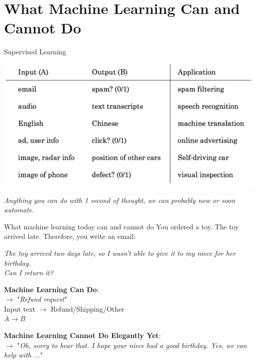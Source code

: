 \documentclass[pdf]{beamer}
\theoremstyle{mystyle}
\begin{document}
\section{What Machine Learning Can and Cannot Do}
\begin{frame}{Supervised Learning}
	\begin{center}
		\includegraphics[scale=.3]{what-ML-can-do}
	\end{center}
	\begin{center}
		\pause \textit{Anything you can do with 1 second of thought, we can probably now or soon automate.}
	\end{center}
\end{frame}

\begin{frame}{What machine learning today can and cannot do}
	You ordered a toy. The toy arrived late. Therefore, you write an email:
	
	\bigskip
	\textit{The toy arrived two days late, so I wasn't able to give it to my niece for her birthday.} \\
	\textit{Can I return it?}

	\bigskip
	\pause \textbf{Machine Learning Can Do}: \\
	$\longrightarrow$ "\textit{Refund request}" \\
	Input text $\longrightarrow$ Refund/Shipping/Other \\
	$A \longrightarrow B$
	
	\bigskip
	\pause \textbf{Machine Learning Cannot Do Elegantly Yet}: \\
	$\longrightarrow$ "\textit{Oh, sorry to hear that. I hope your niece had a good birthday. Yes, we can help with ...}"	
	
\end{frame}
\end{document}
